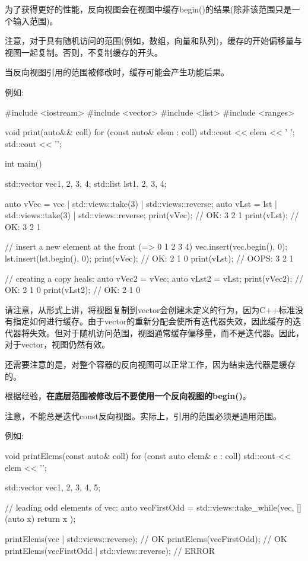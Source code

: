 
为了获得更好的性能，反向视图会在视图中缓存begin()的结果(除非该范围只是一个输入范围)。

注意，对于具有随机访问的范围(例如，数组，向量和队列)，缓存的开始偏移量与视图一起复制。否则，不复制缓存的开头。

当反向视图引用的范围被修改时，缓存可能会产生功能后果。

例如:


\begin{cpp}
#include <iostream>
#include <vector>
#include <list>
#include <ranges>

void print(auto&& coll)
{
	for (const auto& elem : coll) {
		std::cout << elem << ' ';
	}
	std::cout << '\n';
}

int main()
{
	std::vector vec{1, 2, 3, 4};
	std::list lst{1, 2, 3, 4};
	
	auto vVec = vec | std::views::take(3) | std::views::reverse;
	auto vLst = lst | std::views::take(3) | std::views::reverse;
	print(vVec); // OK: 3 2 1
	print(vLst); // OK: 3 2 1
	
	// insert a new element at the front (=> 0 1 2 3 4)
	vec.insert(vec.begin(), 0);
	lst.insert(lst.begin(), 0);
	print(vVec); // OK: 2 1 0
	print(vLst); // OOPS: 3 2 1
	
	// creating a copy heals:
	auto vVec2 = vVec;
	auto vLst2 = vLst;
	print(vVec2); // OK: 2 1 0
	print(vLst2); // OK: 2 1 0
}
\end{cpp}

请注意，从形式上讲，将视图复制到vector会创建未定义的行为，因为C++标准没有指定如何进行缓存。由于vector的重新分配会使所有迭代器失效，因此缓存的迭代器将失效。但对于随机访问范围，视图通常缓存偏移量，而不是迭代器。因此，对于vector，视图仍然有效。

还需要注意的是，对整个容器的反向视图可以正常工作，因为结束迭代器是缓存的。

根据经验，\textbf{在底层范围被修改后不要使用一个反向视图的begin()}。


注意，不能总是迭代const反向视图。实际上，引用的范围必须是通用范围。

例如:

\begin{cpp}
void printElems(const auto& coll) {
	for (const auto elem& e : coll) {
		std::cout << elem << '\n';
	}
}

std::vector vec{1, 2, 3, 4, 5};

// leading odd elements of vec:
auto vecFirstOdd = std::views::take_while(vec, [](auto x) {
						return x %
					});
					
printElems(vec | std::views::reverse); // OK
printElems(vecFirstOdd); // OK
printElems(vecFirstOdd | std::views::reverse); // ERROR
\end{cpp}

